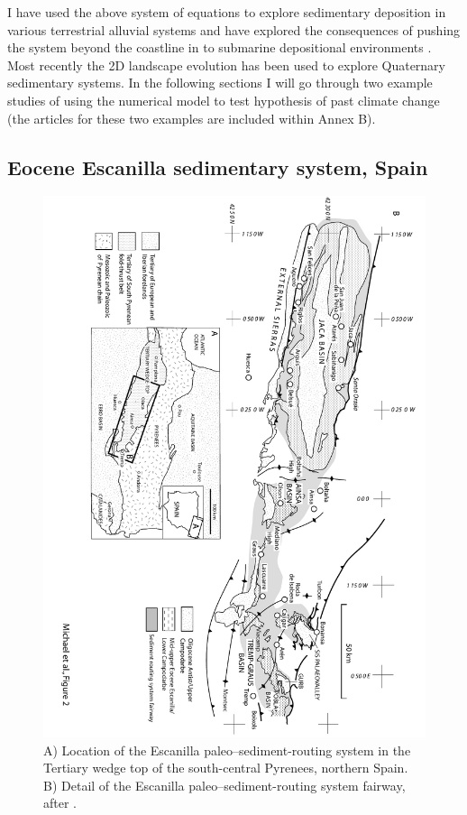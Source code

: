 I have used the above system of equations to explore sedimentary deposition in various terrestrial alluvial systems and have explored the consequences of pushing the system beyond the coastline in to submarine depositional environments \citep{armitage-etal-ngeo-2011,armitage-etal-2015,armitage-etal-br-2018,duller-etal-2019}. Most recently the 2D landscape evolution has been used to explore Quaternary sedimentary systems. In the following sections I will go through two example studies of using the numerical model to test hypothesis of past climate change (the articles for these two examples are included within Annex B).

\subsection{Eocene Escanilla sedimentary system, Spain}

\begin{figure}
\includegraphics[height=\textwidth,angle=90]{./figures/ch2-escanilla-map.pdf}
\caption{A) Location of the Escanilla paleo--sediment-routing system in the Tertiary wedge top of the south-central Pyrenees, northern Spain. B) Detail of the Escanilla paleo--sediment-routing system fairway, after \cite{michael-etal-2014a}.}
\label{fg:escanilla-map}
\end{figure}

